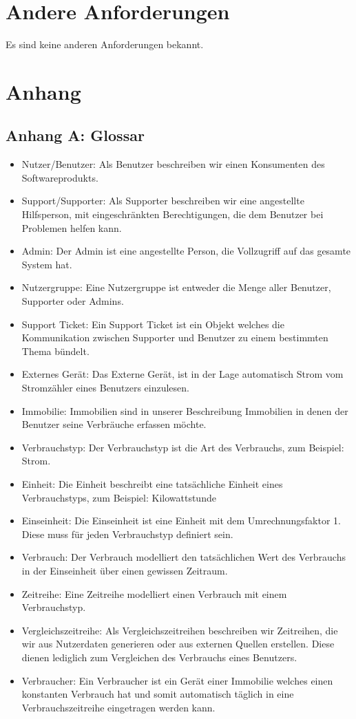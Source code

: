 \section{Andere Anforderungen}
Es sind keine anderen Anforderungen bekannt.
\newpage
\section{Anhang}
\subsection*{Anhang A: Glossar}
\label{glossar}
\begin{itemize}
	\item Nutzer/Benutzer: Als Benutzer beschreiben wir einen Konsumenten des Softwareprodukts.
	\item Support/Supporter: Als Supporter beschreiben wir eine angestellte Hilfsperson, mit eingeschränkten Berechtigungen, die dem Benutzer bei Problemen helfen kann.
	\item Admin: Der Admin ist eine angestellte Person, die Vollzugriff auf das gesamte System hat.
	\item Nutzergruppe: Eine Nutzergruppe ist entweder die Menge aller Benutzer, Supporter oder Admins.
	\item Support Ticket: Ein Support Ticket ist ein Objekt welches die Kommunikation zwischen Supporter und Benutzer zu einem bestimmten Thema bündelt.
	\item Externes Gerät: Das Externe Gerät, ist in der Lage automatisch Strom vom Stromzähler eines Benutzers einzulesen.
	\item Immobilie: Immobilien sind in unserer Beschreibung Immobilien in denen der Benutzer seine Verbräuche erfassen möchte.
	\item Verbrauchstyp: Der Verbrauchstyp ist die Art des Verbrauchs, zum Beispiel: Strom.
	\item Einheit: Die Einheit beschreibt eine tatsächliche Einheit eines Verbrauchstyps, zum Beispiel: Kilowattstunde
	\item Einseinheit: Die Einseinheit ist eine Einheit mit dem Umrechnungsfaktor 1. Diese muss für jeden Verbrauchstyp definiert sein.
	\item Verbrauch: Der Verbrauch modelliert den tatsächlichen Wert des Verbrauchs in der Einseinheit über einen gewissen Zeitraum.
	\item Zeitreihe: Eine Zeitreihe modelliert einen Verbrauch mit einem Verbrauchstyp.
	\item Vergleichszeitreihe: Als Vergleichszeitreihen beschreiben wir Zeitreihen, die wir aus Nutzerdaten generieren oder aus externen Quellen erstellen. Diese dienen lediglich zum Vergleichen des Verbrauchs eines Benutzers.
	\item Verbraucher: Ein Verbraucher ist ein Gerät einer Immobilie welches einen konstanten Verbrauch hat und somit automatisch täglich in eine Verbrauchszeitreihe eingetragen werden kann.
\end{itemize}
